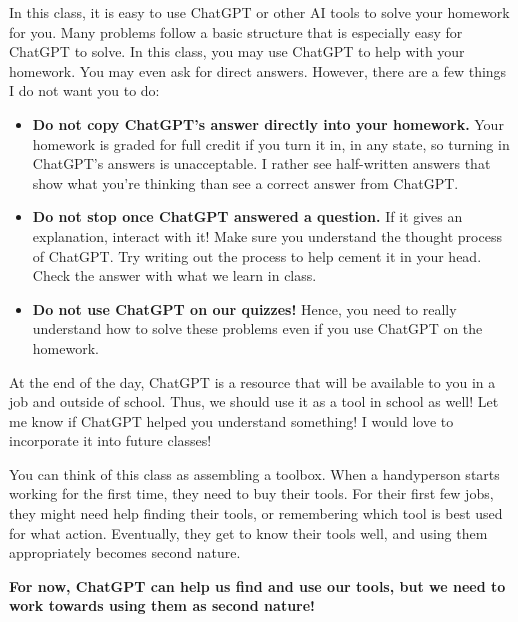 \documentclass[
  letterpaper,
  DIV=11,
  numbers=noendperiod]{scrartcl}
\begin{document}
In this class, it is easy to use ChatGPT or other AI tools to solve your
homework for you. Many problems follow a basic structure that is
especially easy for ChatGPT to solve. In this class, you may use ChatGPT
to help with your homework. You may even ask for direct answers.
However, there are a few things I do not want you to do:

\begin{itemize}
\item
  \textbf{Do not copy ChatGPT's answer directly into your homework.}
  Your homework is graded for full credit if you turn it in, in any
  state, so turning in ChatGPT's answers is unacceptable. I rather see
  half-written answers that show what you're thinking than see a correct
  answer from ChatGPT.
\item
  \textbf{Do not stop once ChatGPT answered a question.} If it gives an
  explanation, interact with it! Make sure you understand the thought
  process of ChatGPT. Try writing out the process to help cement it in
  your head. Check the answer with what we learn in class.
\item
  \textbf{Do not use ChatGPT on our quizzes!} Hence, you need to really
  understand how to solve these problems even if you use ChatGPT on the
  homework.
\end{itemize}

At the end of the day, ChatGPT is a resource that will be available to
you in a job and outside of school. Thus, we should use it as a tool in
school as well! Let me know if ChatGPT helped you understand something!
I would love to incorporate it into future classes!

\begin{tcolorbox}[enhanced jigsaw, bottomtitle=1mm, opacityback=0, toptitle=1mm, breakable, coltitle=black, title=\textcolor{quarto-callout-important-color}{\faExclamation}\hspace{0.5em}{Important}, left=2mm, titlerule=0mm, arc=.35mm, rightrule=.15mm, bottomrule=.15mm, colbacktitle=quarto-callout-important-color!10!white, opacitybacktitle=0.6, leftrule=.75mm, toprule=.15mm, colback=white, colframe=quarto-callout-important-color-frame]

You can think of this class as assembling a toolbox. When a handyperson
starts working for the first time, they need to buy their tools. For
their first few jobs, they might need help finding their tools, or
remembering which tool is best used for what action. Eventually, they
get to know their tools well, and using them appropriately becomes
second nature.

\textbf{For now, ChatGPT can help us find and use our tools, but we need
to work towards using them as second nature!}

\end{tcolorbox}
\end{document}
